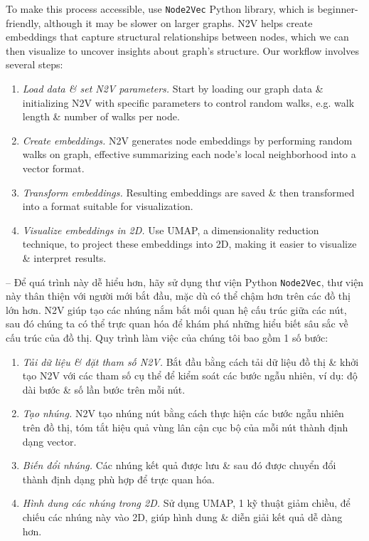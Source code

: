 \documentclass{article}
\begin{document}
\begin{itemize}
\begin{itemize}
        To make this process accessible, use {\tt Node2Vec} Python library, which is beginner-friendly, although it may be slower on larger graphs. N2V helps create embeddings that capture structural relationships between nodes, which we can then visualize to uncover insights about graph's structure. Our workflow involves several steps:
        \begin{enumerate}
            \item {\it Load data \& set N2V parameters.} Start by loading our graph data \& initializing N2V with specific parameters to control random walks, e.g. walk length \& number of walks per node.
            \item {\it Create embeddings.} N2V generates node embeddings by performing random walks on graph, effective summarizing each node's local neighborhood into a vector format.
            \item {\it Transform embeddings.} Resulting embeddings are saved \& then transformed into a format suitable for visualization.
            \item {\it Visualize embeddings in 2D.} Use UMAP, a dimensionality reduction technique, to project these embeddings into 2D, making it easier to visualize \& interpret results.
        \end{enumerate}
        -- Để quá trình này dễ hiểu hơn, hãy sử dụng thư viện Python {\tt Node2Vec}, thư viện này thân thiện với người mới bắt đầu, mặc dù có thể chậm hơn trên các đồ thị lớn hơn. N2V giúp tạo các nhúng nắm bắt mối quan hệ cấu trúc giữa các nút, sau đó chúng ta có thể trực quan hóa để khám phá những hiểu biết sâu sắc về cấu trúc của đồ thị. Quy trình làm việc của chúng tôi bao gồm 1 số bước:
        \begin{enumerate}
            \item {\it Tải dữ liệu \& đặt tham số N2V.} Bắt đầu bằng cách tải dữ liệu đồ thị \& khởi tạo N2V với các tham số cụ thể để kiểm soát các bước ngẫu nhiên, ví dụ: độ dài bước \& số lần bước trên mỗi nút.
            \item {\it Tạo nhúng.} N2V tạo nhúng nút bằng cách thực hiện các bước ngẫu nhiên trên đồ thị, tóm tắt hiệu quả vùng lân cận cục bộ của mỗi nút thành định dạng vector.
            \item {\it Biến đổi nhúng.} Các nhúng kết quả được lưu \& sau đó được chuyển đổi thành định dạng phù hợp để trực quan hóa.
            \item {\it Hình dung các nhúng trong 2D.} Sử dụng UMAP, 1 kỹ thuật giảm chiều, để chiếu các nhúng này vào 2D, giúp hình dung \& diễn giải kết quả dễ dàng hơn.

\end{enumerate}
\end{itemize}
\end{itemize}
\end{document}
